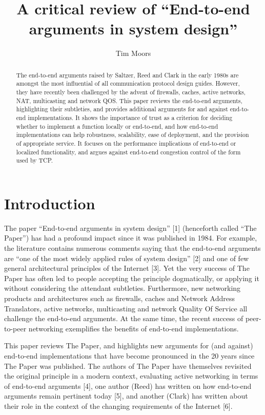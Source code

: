 \documentclass[a4paper,11pt,notitlepage,twoside,openright]{article}
\title{A critical review of ``End-to-end arguments in system design''}
\author{Tim Moors}
\date{}
\begin{document}
\maketitle

\begin{abstract}
The end-to-end arguments raised by Saltzer,
Reed and Clark in the early 1980s are amongst the most influential of
all communication protocol design guides. However, they have recently
been challenged by the advent of firewalls, caches, active networks,
NAT, multicasting and network QOS. This paper reviews the end-to-end
arguments, highlighting their subtleties, and provides additional
arguments for and against end-to-end implementations. It shows the
importance of trust as a criterion for deciding whether to implement a
function locally or end-to-end, and how end-to-end implementations can
help robustness, scalability, ease of deployment, and the provision of
appropriate service. It focuses on the performance implications of
end-to-end or localized functionality, and argues against end-to-end
congestion control of the form used by TCP.
\end{abstract}

\hypertarget{introduction}{%
\section{Introduction}}

The paper ``End-to-end arguments in system design'' {[}1{]} (henceforth
called ``The Paper'') has had a profound impact since it was published
in 1984. For example, the literature contains numerous comments saying
that the end-to-end arguments are ``one of the most widely applied rules
of system design'' {[}2{]} and one of few general architectural
principles of the Internet {[}3{]}. Yet the very success of The Paper
has often led to people accepting the principle dogmatically, or
applying it without considering the attendant subtleties. Furthermore,
new networking products and architectures such as firewalls, caches and
Network Address Translators, active networks, multicasting and network
Quality Of Service all challenge the end-to-end arguments. At the same
time, the recent success of peer-to-peer networking exemplifies the
benefits of end-to-end implementations.

This paper reviews The Paper, and highlights new arguments for (and
against) end-to-end implementations that have become pronounced in the
20 years since The Paper was published. The authors of The Paper have
themselves revisited the original principle in a modern context,
evaluating active networking in terms of end-to-end arguments {[}4{]},
one author (Reed) has written on how end-to-end arguments remain
pertinent today {[}5{]}, and another (Clark) has written about their
role in the context of the changing requirements of the Internet
{[}6{]}.
\end{document}
